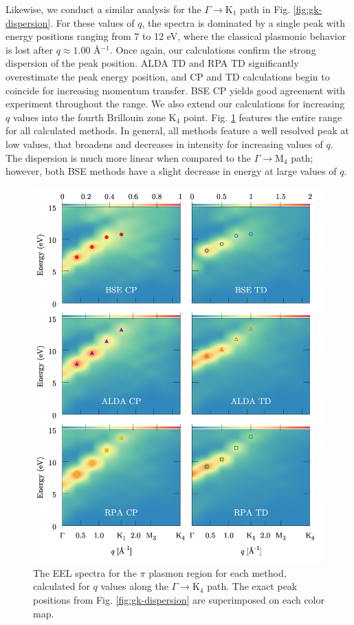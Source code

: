 \documentclass[aps,prb,10pt,showpacs,superscriptaddress,twocolumn,notitlepage]{revtex4-1}
\begin{document}
Likewise, we conduct a similar analysis for the $\Gamma \rightarrow
\mathrm{K}_{1}$ path in Fig. \ref{fig:gk-dispersion}. For these values of
$q$, the spectra is dominated by a single peak with energy positions ranging
from 7 to 12 eV, where the classical plasmonic behavior is lost after $q\approx
1.00$ \r{A}$^{-1}$. Once again, our calculations confirm the strong dispersion
of the peak position. ALDA TD and RPA TD significantly overestimate the peak
energy position, and CP and TD calculations begin to coincide for increasing
momentum transfer. BSE CP yields good agreement with experiment throughout the
range. We also extend our calculations for increasing $q$ values into the fourth
Brillouin zone K$_{4}$ point. Fig. \ref{fig:gk-heatmap_lo} features the entire
range for all calculated methods. In general, all methods feature a well
resolved peak at low values, that broadens and decreases in intensity for
increasing values of $q$. The dispersion is much more linear when compared to
the $\Gamma \rightarrow \mathrm{M}_{4}$ path; however, both BSE methods have a
slight decrease in energy at large values of $q$.

\begin{figure}[t]
\includegraphics[width=\linewidth]{fig08}
\caption{The EEL spectra for the $\pi$ plasmon region for each method,
calculated for $q$ values along the $\Gamma \rightarrow \mathrm{K}_{4}$ path.
The exact peak positions from Fig. \ref{fig:gk-dispersion} are superimposed on
each color map.}
\label{fig:gk-heatmap_lo}
\end{figure}
\end{document}
